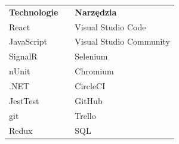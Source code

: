 \documentclass[12pt]{report}
\begin{document}
	\begin{center}
		\begin{table}[h]
			\def\arraystretch{1.3}
			\begin{tabular}{lll}
				
				\textbf{Technologie} & \hspace{20mm} & \textbf{Narzędzia}      \\
				React                &  & Visual Studio Code      	\\
				JavaScript           &  & Visual Studio Community 	\\
				SignalR              &  & Selenium                	\\
				nUnit                &  & Chromium                	\\
				.NET                 &  & CircleCI                	\\
				JestTest             &  & GitHub                  	\\
				git                  &  & Trello                       	\\
				Redux				 &  & SQL						\\
			\end{tabular}
		\end{table}
\end{center}
	
	
\end{document}
